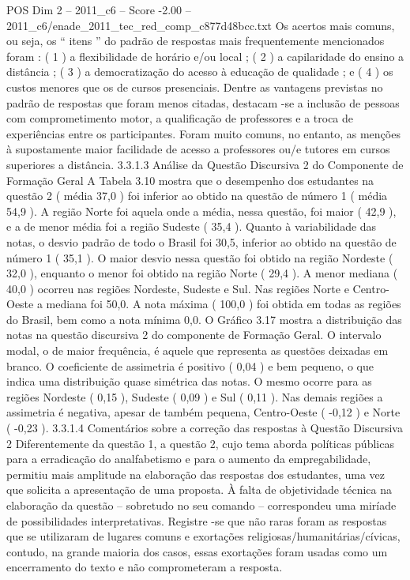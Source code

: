 \begin{textsample}{POS Dim 2 – 2011\_c6 – Score -2.00 – 2011\_c6/enade\_2011\_tec\_red\_comp\_c877d48bcc.txt}
Os acertos mais comuns, ou seja, os “ itens ” do padrão de respostas mais frequentemente mencionados foram : ( 1 ) a flexibilidade de horário e/ou local ; ( 2 ) a capilaridade do ensino a distância ; ( 3 ) a democratização do acesso à educação de qualidade ; e ( 4 ) os custos menores que os de cursos presenciais.
Dentre as vantagens previstas no padrão de respostas que foram menos citadas, destacam -se a inclusão de pessoas com comprometimento motor, a qualificação de professores e a troca de experiências entre os participantes.
Foram muito comuns, no entanto, as menções à supostamente maior facilidade de acesso a professores ou/e tutores em cursos superiores a distância. 3.3.1.3 Análise da Questão Discursiva 2 do Componente de Formação Geral A Tabela 3.10 mostra que o desempenho dos estudantes na questão 2 ( média 37,0 ) foi inferior ao obtido na questão de número 1 ( média 54,9 ).
A região Norte foi aquela onde a média, nessa questão, foi maior ( 42,9 ), e a de menor média foi a região Sudeste ( 35,4 ).
Quanto à variabilidade das notas, o desvio padrão de todo o Brasil foi 30,5, inferior ao obtido na questão de número 1 ( 35,1 ).
O maior desvio nessa questão foi obtido na região Nordeste ( 32,0 ), enquanto o menor foi obtido na região Norte ( 29,4 ).
A menor mediana ( 40,0 ) ocorreu nas regiões Nordeste, Sudeste e Sul.
Nas regiões Norte e Centro-Oeste a mediana foi 50,0.
A nota máxima ( 100,0 ) foi obtida em todas as regiões do Brasil, bem como a nota mínima 0,0.
O Gráfico 3.17 mostra a distribuição das notas na questão discursiva 2 do componente de Formação Geral.
O intervalo modal, o de maior frequência, é aquele que representa as questões deixadas em branco.
O coeficiente de assimetria é positivo ( 0,04 ) e bem pequeno, o que indica uma distribuição quase simétrica das notas.
O mesmo ocorre para as regiões Nordeste ( 0,15 ), Sudeste ( 0,09 ) e Sul ( 0,11 ).
Nas demais regiões a assimetria é negativa, apesar de também pequena, Centro-Oeste ( -0,12 ) e Norte ( -0,23 ). 3.3.1.4 Comentários sobre a correção das respostas à Questão Discursiva 2 Diferentemente da questão 1, a questão 2, cujo tema aborda políticas públicas para a erradicação do analfabetismo e para o aumento da empregabilidade, permitiu mais amplitude na elaboração das respostas dos estudantes, uma vez que solicita a apresentação de uma proposta.
À falta de objetividade técnica na elaboração da questão – sobretudo no seu comando – correspondeu uma miríade de possibilidades interpretativas.
Registre -se que não raras foram as respostas que se utilizaram de lugares comuns e exortações religiosas/humanitárias/cívicas, contudo, na grande maioria dos casos, essas exortações foram usadas como um encerramento do texto e não comprometeram a resposta.

\end{textsample}
